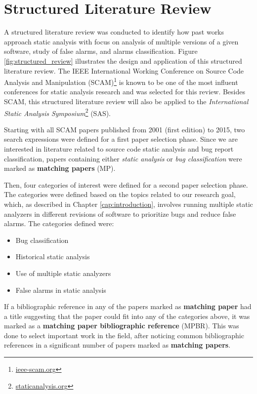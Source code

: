 \chapter{Structured Literature Review}
\label{ch:literature}

A structured literature review was conducted to identify how past works
approach static analysis with focus on analysis of multiple versions of a given
software, study of false alarms, and alarms classification. Figure
\ref{fig:structured_review} illustrates the design and application of this
structured literature review. The IEEE International Working Conference on Source Code
Analysis and Manipulation (SCAM)\footnote{\url{ieee-scam.org}} is known to be
one of the most influent conferences for static analysis research and was
selected for this review.  Besides SCAM, this structured literature review will also be
applied to the \textit{International Static Analysis
Symposium}\footnote{\url{staticanalysis.org}} (SAS).



Starting with all SCAM papers published from 2001 (first edition) to 2015, two
search expressions were defined for a first paper selection phase. Since we are interested
in literature related to source code static analysis and  bug report
classification, papers containing either \textit{static analysis} or
\textit{bug classification} were marked as \textbf{matching papers} (MP).

Then, four categories of interest were defined for a second paper selection phase. The
categories were defined based on the topics related to our research goal, which,
as described in Chapter \ref{cap:introduction}, involves running multiple static
analyzers in different revisions of software to prioritize bugs and reduce false
alarms. The categories defined were:

\begin{itemize}
\item Bug classification
\item Historical static analysis
\item Use of multiple static analyzers
\item False alarms in static analysis
\end{itemize}

If a bibliographic reference in any of the papers marked as \textbf{matching
paper} had a title suggesting that the paper could fit into any of the
categories above, it was marked as a \textbf{matching paper bibliographic
reference} (MPBR). This was done to select important work in the field,
after noticing common bibliographic references in a significant number of
papers marked as \textbf{matching papers}.


